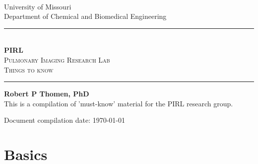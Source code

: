 \documentclass[11pt]{article}
\begin{document}
 
 




\begin{titlepage}
\begin{center}



\; \\ \; \\ \; \\ \; \\ \; \\ \; \\

\Large University of Missouri \\
\Large Department of Chemical and Biomedical Engineering\\

\vspace{2.5cm}




\rule{6cm}{1pt}\\
\vspace{.3cm}
\Large \textbf{PIRL}\\
\vspace{.5cm}
\textsc{\Large Pulmonary Imaging Research Lab \\ Things to know}\\

\vspace{.1cm}
\rule{6cm}{1pt}

\vspace{4cm}
\Large \textbf{Robert P Thomen, PhD}\\



\vspace{4cm}
\Large This is a compilation of 'must-know' material for the PIRL research group.

Document compilation date: \today


\end{center}
\end{titlepage}

\chapter{Basics}
\end{document}
